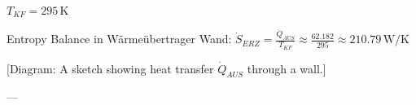 \( T_{KF} = 295 \, \text{K} \)  

Entropy Balance in Wärmeübertrager Wand:  
\( \dot{S}_{ERZ} = \frac{\dot{Q}_{AUS}}{T_{KF}} \approx \frac{62.182}{295} \approx 210.79 \, \text{W/K} \)  

[Diagram: A sketch showing heat transfer \( \dot{Q}_{AUS} \) through a wall.]

---